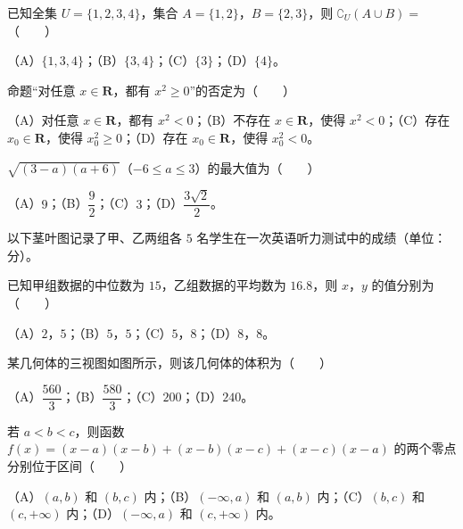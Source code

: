 \begin{question}
已知全集 $U=\{1,2,3,4\}$，集合 $A=\{1,2\}$，$B=\{2,3\}$，则 $\complement_U(A\cup B)=$\mbox{（　　）}

（A）$\{1,3,4\}$；（B）$\{3,4\}$；（C）$\{3\}$；（D）$\{4\}$。

\end{question}
\begin{question}
命题“对任意 $x\in\mathbf R$，都有 $x^2\geqslant0$”的否定为\mbox{（　　）}

（A）对任意 $x\in\mathbf R$，都有 $x^2<0$；（B）不存在 $x\in\mathbf R$，使得 $x^2<0$；（C）存在 $x_0\in\mathbf R$，使得 $x_0^2\geqslant0$；（D）存在 $x_0\in\mathbf R$，使得 $x_0^2<0$。

\end{question}
\begin{question}
$\sqrt{(3-a)(a+6)}$（$-6\leqslant a\leqslant3$）的最大值为\mbox{（　　）}

（A）$9$；（B）$\dfrac92$；（C）$3$；（D）$\dfrac{3\sqrt2}2$。

\Needspace{0.4\textheight}
\end{question}
\begin{question}
以下茎叶图记录了甲、乙两组各 $5$ 名学生在一次英语听力测试中的成绩（单位：分）。
\nopagebreak[4]
\begin{center}\end{center}
\nopagebreak[4]
已知甲组数据的中位数为 $15$，乙组数据的平均数为 $16.8$，则 $x$，$y$ 的值分别为\mbox{（　　）}

（A）$2$，$5$；（B）$5$，$5$；（C）$5$，$8$；（D）$8$，$8$。

\Needspace{0.4\textheight}
\end{question}
\begin{question}
某几何体的三视图如图所示，则该几何体的体积为\mbox{（　　）}
\nopagebreak[4]
\begin{center}\end{center}
\nopagebreak[4]
（A）$\dfrac{560}3$；（B）$\dfrac{580}3$；（C）$200$；（D）$240$。

\end{question}
\begin{question}
若 $a<b<c$，则函数 $f(x)=(x-a)(x-b)+(x-b)(x-c)+(x-c)(x-a)$ 的两个零点分别位于区间\mbox{（　　）}

（A）$(a,b)$ 和 $(b,c)$ 内；（B）$(-\infty,a)$ 和 $(a,b)$ 内；（C）$(b,c)$ 和 $(c,+\infty)$ 内；（D）$(-\infty,a)$ 和 $(c,+\infty)$ 内。

\end{question}
